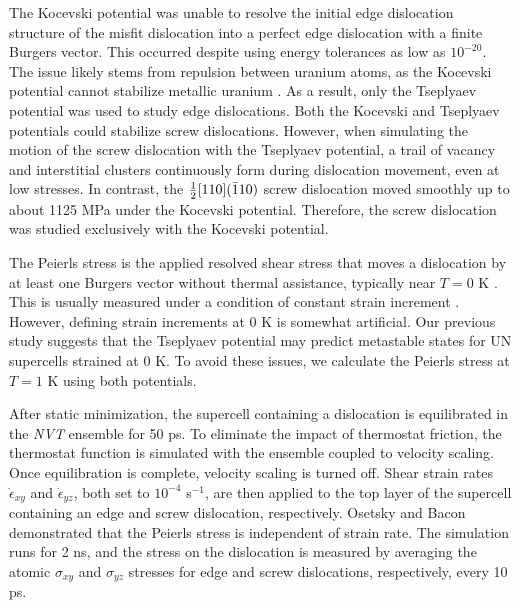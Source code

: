 \documentclass[applsci,article,submit,pdftex,moreauthors]{Definitions/mdpi}
\newcommand{\?}{\stackrel{?}{=}}
\providecommand{\DIFadd}[1]{{\bf #1}} %
\providecommand{\DIFdel}[1]{} %
\providecommand{\DIFaddbegin}{\protect\color{blue}} %
\providecommand{\DIFaddend}{\protect\color{black}} %
\providecommand{\DIFdelbegin}{\protect\color{red}} %
\providecommand{\DIFdelend}{\protect\color{black}} %
\newcommand{\DIFscaledelfig}{0.5}
\newlength{\DIFdelgraphicswidth} %
\newlength{\DIFdelgraphicsheight} %
\newcommand{\DIFaddincludegraphics}[2][]{{\color{blue}\fbox{\DIFOincludegraphics[#1]{#2}}}} %
\newcommand{\DIFdelincludegraphics}[2][]{%
\sbox{\DIFdelgraphicsbox}{\DIFOincludegraphics[#1]{#2}}%
\settoboxwidth{\DIFdelgraphicswidth}{\DIFdelgraphicsbox} %
\settoboxtotalheight{\DIFdelgraphicsheight}{\DIFdelgraphicsbox} %
\scalebox{\DIFscaledelfig}{%
\parbox[b]{\DIFdelgraphicswidth}{\usebox{\DIFdelgraphicsbox}\\[-\baselineskip] \rule{\DIFdelgraphicswidth}{0em}}\llap{\resizebox{\DIFdelgraphicswidth}{\DIFdelgraphicsheight}{%
\setlength{\unitlength}{\DIFdelgraphicswidth}%
\begin{picture}(1,1)%
\thicklines\linethickness{2pt} %
{\color[rgb]{1,0,0}\put(0,0){\framebox(1,1){}}}%
{\color[rgb]{1,0,0}\put(0,0){\line( 1,1){1}}}%
{\color[rgb]{1,0,0}\put(0,1){\line(1,-1){1}}}%
\end{picture}%
}\hspace*{3pt}}} %
} %
\DeclareRobustCommand{\DIFaddbegin}{\DIFOaddbegin \let\includegraphics\DIFaddincludegraphics} %
\DeclareRobustCommand{\DIFaddend}{\DIFOaddend \let\includegraphics\DIFOincludegraphics} %
\DeclareRobustCommand{\DIFdelbegin}{\DIFOdelbegin \let\includegraphics\DIFdelincludegraphics} %
\DeclareRobustCommand{\DIFdelend}{\DIFOaddend \let\includegraphics\DIFOincludegraphics} %
\begin{document}
The Kocevski potential was unable to resolve the initial edge dislocation structure of the misfit dislocation into a perfect edge dislocation with a finite Burgers vector. This occurred despite using energy tolerances as low as $10^{-20}$. The issue likely stems from repulsion between uranium atoms, as the Kocevski potential cannot stabilize metallic uranium \cite{AbdulHameed2024}. As a result, only the Tseplyaev potential was used to study edge dislocations. Both the Kocevski and Tseplyaev potentials could stabilize screw dislocations. However, when simulating the motion of the screw dislocation with the Tseplyaev potential, a trail of vacancy and interstitial clusters continuously form during dislocation movement, even at low stresses. In contrast, the $\frac{1}{2} [110] ( \Bar{1} 1 0 )$ screw dislocation moved smoothly up to about 1125 MPa under the Kocevski potential. Therefore, the screw dislocation was studied exclusively with the Kocevski potential.

The Peierls stress is the applied resolved shear stress that moves a dislocation by at least one Burgers vector without thermal assistance, typically near $T = 0$ K \cite{Hull2011}. This is usually measured under a condition of constant strain increment \cite{Puls1976, Osetsky2003}. However, defining strain increments at 0 K is somewhat artificial. Our previous study \cite{AbdulHameed2024} suggests that the Tseplyaev potential may predict metastable states for UN supercells strained at 0 K. To avoid these issues, we calculate the Peierls stress at $T = 1$ K using both potentials.

After static minimization, the supercell containing a dislocation is equilibrated in the \textit{NVT} ensemble for 50 ps. To eliminate the impact of thermostat friction, the thermostat function is simulated with the \DIFdelbegin \DIFdel{\textit{NVE} }\DIFdelend \DIFaddbegin \DIFadd{microcanonical (\textit{NVE}) }\DIFaddend ensemble coupled to velocity scaling. Once equilibration is complete, velocity scaling is turned off. Shear strain rates $\Dot{\epsilon}_{xy}$ and $\Dot{\epsilon}_{yz}$, both set to $10^{-4}$ s$^{-1}$, are then applied to the top layer of the supercell containing an edge and screw dislocation, respectively. Osetsky and Bacon \cite{Osetsky2003} demonstrated that the Peierls stress is independent of strain rate. The simulation runs for 2 ns, and the stress on the dislocation is measured by averaging the atomic $\sigma_{xy}$ and $\sigma_{yz}$ stresses for edge and screw dislocations, respectively, every 10 ps.
\end{document}
